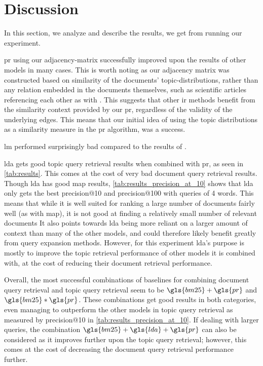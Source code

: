 \section{Discussion}\label{sec:discussion}
In this section, we analyze and describe the results, we get from running our experiment.

\gls{pr} using our adjacency-matrix successfully improved upon the results of other models in many cases.
This is worth noting as our adjacency matrix was constructed based on similarity of the documents' topic-distributions, rather than any relation embedded in the documents themselves, such as scientific articles referencing each other as with \citeauthor{yang2009topic}\cite{yang2009topic}.
This suggests that other \gls{ir} methods benefit from the similarity context provided by our \gls{pr}, regardless of the validity of the underlying edges.
This means that our initial idea of using the topic distributions as a similarity measure in the \gls{pr} algorithm, was a success.

\gls{lm} performed surprisingly bad compared to the results of \cite{yang2009topic}. 

\gls{lda} gets good topic query retrieval results when combined with \gls{pr}, as seen in \autoref{tab:results}.
This comes at the cost of very bad document query retrieval results.
Though \gls{lda} has good \gls{map} results, \autoref{tab:results_precision_at_10} shows that \gls{lda} only gets the best precision@10 and precision@100 with queries of 4 words.
This means that while it is well suited for ranking a large number of documents fairly well (as with \gls{map}), it is not good at finding a relatively small number of relevant documents
It also points towards \gls{lda} being more reliant on a larger amount of context than many of the other models, and could therefore likely benefit greatly from query expansion methods.
However, for this experiment \gls{lda}'s purpose is mostly to improve the topic retrieval performance of other models it is combined with, at the cost of reducing their document retrieval performance.

Overall, the most successful combinations of baselines for combining document query retrieval and topic query retrieval seem to be $\gls{bm25}+\gls{pr}$ and $\gls{bm25}*\gls{pr}$.
These combinations get good results in both categories, even managing to outperform the other models in topic query retrieval as measured by precision@10 in \autoref{tab:results_precision_at_10}.
If dealing with larger queries, the combination $\gls{bm25}+\gls{lda}+\gls{pr}$ can also be considered as it improves further upon the topic query retrieval; however, this comes at the cost of decreasing the document query retrieval performance further.
